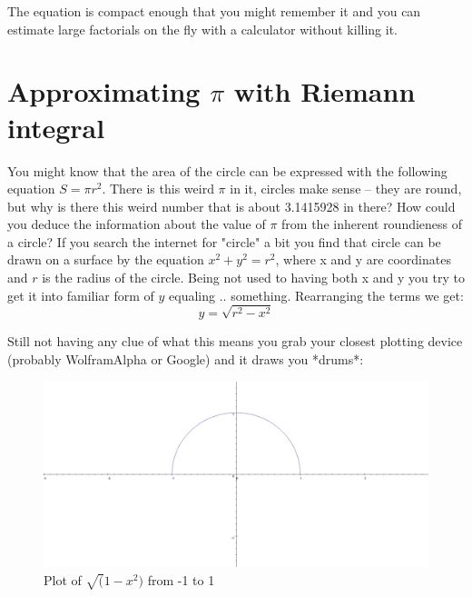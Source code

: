 \documentclass[pdftex, 12pt, a4paper]{report}
\begin{document}
	The equation is compact enough that you might remember it and you can estimate large factorials on the fly with a calculator without killing it.
	\section{Approximating $\pi$ with Riemann integral}
	
	You might know that the area of the circle can be expressed with the following equation $S = \pi r^2$. There is this weird $\pi$ in it, circles make sense -- they are round, but why is there this weird number that is about 3.1415928 in there? How could you deduce the information about the value of $\pi$ from the inherent roundieness of a circle? If you search the internet for "circle" a bit you find that circle can be drawn on a surface by the equation $x^2 + y^2 = r^2$, where x and y are coordinates and $r$ is the radius of the circle. Being not used to having both x and y you try to get it into familiar form of $y$ equaling .. something. Rearranging the terms we get: $$y = \sqrt{r^2 - x^2}$$
	
	Still not having any clue of what this means you grab your closest plotting device (probably WolframAlpha or Google) and it draws you *drums*:
	
	\begin{figure}[H]
		\centering
		\includegraphics[scale=0.2]{circle}
		\caption{Plot of $\sqrt(1 - x^2)$ from -1 to 1}
	\end{figure}
\end{document}
